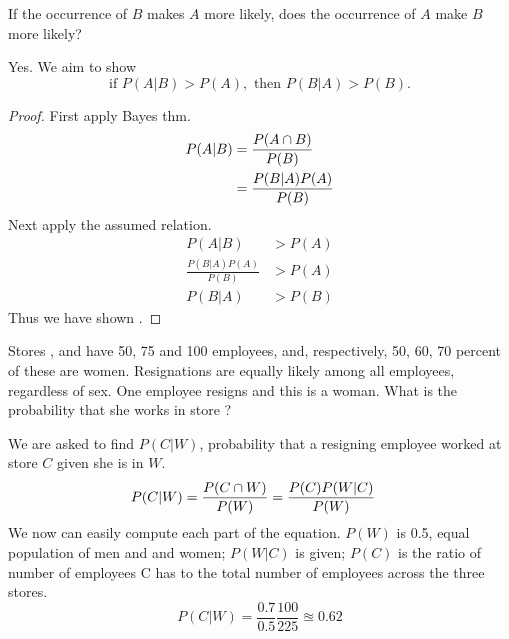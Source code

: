 \documentclass{article}
\begin{document}
    \newpage

    \begin{problem}
        If the occurrence of $B$ makes $A$ more likely, does the occurrence of $A$ make $B$ more likely?
    \end{problem}

    \begin{solution}
        Yes. We aim to show
        \begin{equation}
            \text{if } P(A|B) > P(A), \text{ then } P(B | A) > P(B).
            \label{eq:A_B}
        \end{equation}
        \begin{proof}
            First apply Bayes thm.
            \begin{align*}
                P(A|B) &= \frac{P(A\cap B)} {P(B)} \\
                    &= \frac{P(B|A)P(A)} {P(B)}
            \end{align*}    
            Next apply the assumed relation.
            \begin{align*}
                P(A|B) &> P(A) \\
                \frac{P(B|A) P(A)}{P(B)} &> P(A) \\
                P(B|A) &> P(B)
            \end{align*}
            Thus we have shown .
        \end{proof}
    \end{solution}

    \nextproblem

    \begin{problem}
        Stores \A, \B{} and \C{} have 50, 75 and 100 employees, and, respectively, 50, 60, 70 percent of these are women. Resignations are equally likely  among all employees, regardless of sex. One employee resigns and this is a woman. What is the probability that she works in store \C?
    \end{problem}
    
    \begin{solution}
        We are asked to find $P(C | W)$, probability that a resigning employee worked at store $C$ given she is in $W$. 
        \begin{align}
            P(C | W) &= \frac{P(C \cap W)} {P(W)} = \frac{P(C) P(W | C)} {P(W)}
        \end{align}
        We now can easily compute each part of the equation. $P(W)$ is 0.5, equal population of men and and women; $P(W | C)$ is given; $P(C)$ is the ratio of number of employees C has to the total number of employees across the three stores.
        \begin{equation}
            P(C | W) = \frac{0.7}{0.5} \frac{100}{225} \approxeq 0.62
        \end{equation}
    \end{solution}
\end{document}
